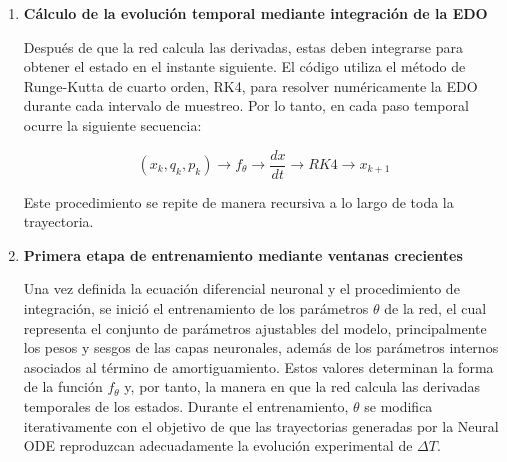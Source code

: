 \documentclass[11pt]{report}
\begin{document}
\begin{enumerate}
Las cinco salidas de esta red no corresponden directamente a los estados siguientes, sino a sus derivadas temporales:
$$f_\theta(\cdot) = \begin{bmatrix}
\frac{d\Delta T_n}{dt} \\[6pt]
\frac{dz_1}{dt} \\[2pt]
\vdots \\[2pt]
\frac{dz_4}{dt}
\end{bmatrix}.$$

Es en este punto donde el código construye propiamente la EDO neuronal: la red aprende la función que relaciona el estado actual y las entradas con la velocidad de cambio de cada uno de los estados. Durante el entrenamiento, los pesos y sesgos de la red son modificados para que estas derivadas generen posteriormente una trayectoria de temperatura próxima a la experimental.
En la formulación también se incorpora un término de amortiguamiento sobre los estados para favorecer la estabilidad numérica durante integraciones prolongadas.

\item \textbf{Cálculo de la evolución temporal mediante integración de la EDO}

Después de que la red calcula las derivadas, estas deben integrarse para obtener el estado en el instante siguiente. El código utiliza el método de Runge-Kutta de cuarto orden, RK4, para resolver numéricamente la EDO durante cada intervalo de muestreo. Por lo tanto, en cada paso temporal ocurre la siguiente secuencia:

$$(x_k,q_k,p_k)\rightarrow f_\theta\rightarrow\frac{dx}{dt}\rightarrow RK4\rightarrow x_{k+1}$$

Este procedimiento se repite de manera recursiva a lo largo de toda la trayectoria. 

\item \textbf{Primera etapa de entrenamiento mediante ventanas crecientes}

Una vez definida la ecuación diferencial neuronal y el procedimiento de integración, se inició el entrenamiento de los parámetros $\theta$ de la red, el cual representa el conjunto de parámetros ajustables del modelo, principalmente los pesos y sesgos de las capas neuronales, además de los parámetros internos asociados al término de amortiguamiento. Estos valores determinan la forma de la función $f_\theta$ y, por tanto, la manera en que la red calcula las derivadas temporales de los estados. Durante el entrenamiento, $\theta$ se modifica iterativamente con el objetivo de que las trayectorias generadas por la Neural ODE reproduzcan adecuadamente la evolución experimental de $\Delta T$.


\end{enumerate}
\end{document}
